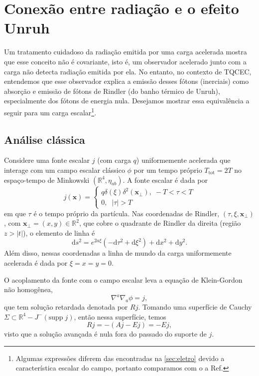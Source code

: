 \documentclass[12pt]{article}
\newcommand{\dd}{\mathrm{d}}
\newcommand{\x}{\mathbf{x}}
\newcommand{\Ttot}{T_{\text{tot}}}
\newcommand{\xperp}{\mathbf{x}_{\perp}}
\newcommand{\supp}[1]{\text{supp}\;#1}
\begin{document}
\section{Conexão entre radiação e o efeito Unruh}
Um tratamento cuidadoso da radiação emitida por uma carga acelerada mostra que esse conceito não é covariante\cite{boulware}, isto é, um observador acelerado junto com a carga não detecta radiação emitida por ela. No entanto, no contexto de TQCEC, entendemos que esse observador explica a emissão desses fótons (inerciais) como absorção e emissão de fótons de Rindler (do banho térmico de Unruh), especialmente dos fótons de energia nula. Desejamos mostrar essa equivalência a seguir para um carga escalar\footnote{Algumas expressões diferem das encontradas na \cref{sec:eletro} devido a característica escalar do campo, portanto comparamos com o a Ref\cite{ren}.}.

\subsection*{Análise clássica}
Considere uma fonte escalar \(j\) (com carga \(q\)) uniformemente acelerada que interage com um campo escalar clássico \(\phi\) por um tempo próprio \(\Ttot=2T\) no espaço-tempo de Minkowski \((\mathbb{R}^4,\eta_{ab})\). A fonte escalar é dada por
\begin{equation}
    j(\x)=
    \begin{cases}
        q\delta(\xi)\delta^2(\xperp),\;-T<\tau<T\\
        0,\;\;\lvert\tau\rvert>T
    \end{cases}
\end{equation}
em que \(\tau\) é o tempo próprio da partícula. Nas coordenadas de Rindler, \((\tau,\xi,\xperp)\), com \(\xperp=(x,y)\in\mathbb{R}^2\), que cobre o quadrante de Rindler da direita (região \(z>\lvert t\rvert\)), o elemento de linha é
\begin{equation}
    \dd s^2=e^{2a\xi}(-\dd\tau^2+\dd\xi^2)+\dd x^2+\dd y^2.
\end{equation}
Além disso, nessas coordenadas a linha de mundo da carga uniformemente acelerada é dada por \(\xi=x=y=0\).

O acoplamento da fonte com o campo escalar leva a equação de Klein-Gordon não homogênea,
\begin{equation}
    \nabla^a\nabla_a\phi=j,
\end{equation}
que tem solução retardada denotada por \(Rj\). Tomando uma superfície de Cauchy \(\Sigma\subset\mathbb{R}^4-J^-(\supp{j})\), então nessa superfície, temos
\begin{equation}
    Rj=-(Aj-Ej)=-Ej,
\end{equation}
visto que a solução avançada é nula fora do passado do suporte de \(j\).
\end{document}
